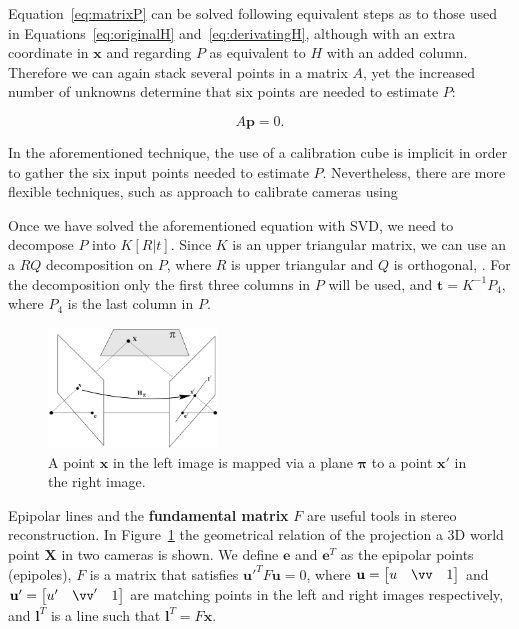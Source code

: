 \documentclass[12pt]{article}
\begin{document}
Equation~\ref{eq:matrixP} can be solved following equivalent steps as to those used in Equations~\ref{eq:originalH} and~\ref{eq:derivatingH}, although with an extra coordinate in $\mathbf{x}$ and regarding $P$ as equivalent to $H$ with an added column.
Therefore we can again stack several points in a matrix $A$, yet the increased number of unknowns determine that six points are needed to estimate $P$:

\begin{equation}
A\mathbf{p} = 0.
\end{equation}

In the aforementioned technique, the use of a calibration cube is implicit in order to gather the six input points needed to estimate $P$.
Nevertheless, there are more flexible techniques, such as \cite{Zhang2000} approach to calibrate cameras using 

Once we have solved the aforementioned equation with SVD, we need to decompose $P$ into $K[R|t]$.
Since $K$ is an upper triangular matrix, we can use an a $RQ$ decomposition on $P$, where $R$ is upper triangular and $Q$ is orthogonal, \cite{Francis1961}.
For the decomposition only the first three columns in $P$ will be used, and $\mathbf{t} = K^{-1}P_4$, where $P_4$ is the last column in $P$.


\begin{figure}[htbp!]
	\centering
	\includegraphics[width=0.4\textwidth]{images/epipolarLines}
	\caption{A point $\mathbf{x}$ in the left image is mapped via a plane $\boldsymbol{\pi}$ to a point $\mathbf{x}'$ in the right image.}\label{fig:epipolarLines}
\end{figure}

Epipolar lines and the \textbf{fundamental matrix} $F$ are useful tools in stereo reconstruction.
In Figure~\ref{fig:epipolarLines} the geometrical relation of the projection a 3D world point $\mathbf{X}$ in two cameras is shown.
We define $\mathbf{e}$ and $\mathbf{e}^T$ as the epipolar points (epipoles), $F$ is a matrix that satisfies $\mathbf{u}'^TF\mathbf{u} = 0$, where $\mathbf{u} = \begin{bmatrix} u & \vv & 1 \end{bmatrix}$ and $\mathbf{u}' = \begin{bmatrix} u' & \vv' & 1 \end{bmatrix}$ are matching points in the left and right images respectively, and $\mathbf{l}^T$ is a line such that $\mathbf{l}^T = F\mathbf{x}$.
\end{document}
